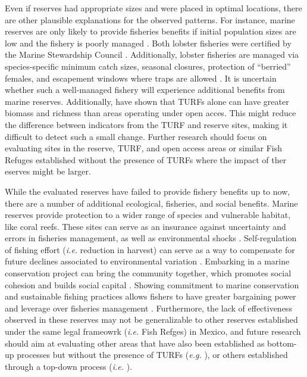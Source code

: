 \documentclass{frontiersSCNS}
\begin{document}
Even if reserves had appropriate sizes and were placed in optimal
locations, there are other plausible explanations for the observed
patterns. For instance, marine reserves are only likely to provide
fisheries benefits if initial population sizes are low and the fishery
is poorly managed \citep{hilborn_2006}. Both lobster fisheries were
certified by the Marine Stewardship Council \citep{prezramrez_2016-J1}.
Additionally, lobster fisheries are managed via species-specific minimum
catch sizes, seasonal closures, protection of ``berried'' females, and
escapement windows where traps are allowed \citep{dof_website_1993}. It
is uncertain whether such a well-managed fishery will experience
additional benefits from marine reserves. Additionally,
\citet{gelcich_2008} have shown that TURFs alone can have greater
biomass and richness than areas operating under open acces. This might
reduce the difference between indicators from the TURF and reserve
sites, making it difficult to detect such a small change. Further
research should focus on evaluating sites in the reserve, TURF, and open
access areas or similar Fish Refuges established without the presence of
TURFs where the impact of ther eserves might be larger.

While the evaluated reserves have failed to provide fishery benefits up
to now, there are a number of additional ecological, fisheries, and
social benefits. Marine reserves provide protection to a wider range of
species and vulnerable habitat, like coral reefs. These sites can serve
as an insurance against uncertainty and errors in fisheries management,
as well as environmental shocks
\citep{hilborn_2004,hilborn_2006,micheli_2012-EU,aalto}. Self-regulation
of fishing effort (\emph{i.e.} reduction in harvest) can serve as a way
to compensate for future declines associated to environmental variation
\citep{finkbeiner_2018}. Embarking in a marine conservation project can
bring the community together, which promotes social cohesion and builds
social capital \citep{fulton_2019}. Showing commitment to marine
conservation and sustainable fishing practices allows fishers to have
greater bargaining power and leverage over fisheries management
\citep{prezramrez_2012}. Furthermore, the lack of effectiveness observed
in these reserves may not be generalizable to other reserves established
under the same legal frameowrk (\emph{i.e.} Fish Refges) in Mexico, and
future research should aim at evaluating other areas that have also been
established as bottom-up processes but without the presence of TURFs
(\emph{e.g.} \citet{dof_websiteC_2012}), or others established through a
top-down process (\emph{i.e.} \citet{dof_websiteU_2018}).
\end{document}

